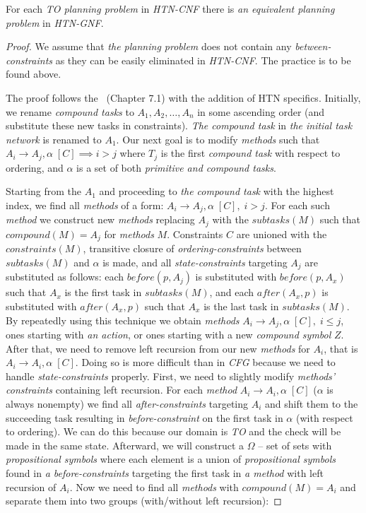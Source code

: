 \begin{thm}\label{thm04:13}
    For each \emph{TO planning problem} in \emph{HTN-CNF} there is \emph{an equivalent planning problem} in \emph{HTN-GNF}.
\end{thm}
\begin{proof}
    We assume that \emph{the planning problem} does not contain any \emph{between-constraints} as they can be easily eliminated in \emph{HTN-CNF}. The practice is to be found above.

    The proof follows the~\cite{gnf} (Chapter 7.1) with the addition of HTN specifics. Initially, we rename \emph{compound tasks} to $A_1, A_2, \dots, A_n$ in some ascending order (and substitute these new tasks in constraints). \emph{The compound task} in \emph{the initial task network} is renamed to $A_1$. Our next goal is to modify \emph{methods} such that $A_i \rightarrow A_j, \alpha \; [C] \implies i > j$ where $T_j$ is the first \emph{compound task} with respect to ordering, and $\alpha$ is a set of both \emph{primitive and compound tasks}.

    Starting from the $A_1$ and proceeding to \emph{the compound task} with the highest index, we find all \emph{methods} of a form:  $A_i \rightarrow A_j, \alpha \; [C], \; i > j$. For each such \emph{method} we construct new \emph{methods} replacing $A_j$ with the $subtasks(M)$ such that $compound(M) = A_j$ for \emph{methods} $M$. Constraints $C$ are unioned with the $constraints(M)$, transitive closure of \emph{ordering-constraints} between $subtasks(M)$ and $\alpha$ is made, and all \emph{state-constraints} targeting $A_j$ are substituted as follows: each $before(p, A_j)$ is substituted with $before(p, A_x)$ such that $A_x$ is the first task in $subtasks(M)$, and each $after(A_x, p)$ is substituted with $after(A_x, p)$ such that $A_x$ is the last task in $subtasks(M)$. By repeatedly using this technique we obtain \emph{methods} $A_i \rightarrow A_j, \alpha \; [C], \; i \leq j$, ones starting with \emph{an action}, or ones starting with a new \emph{compound symbol} $Z$. After that, we need to remove left recursion from our new \emph{methods} for $A_i$, that is $A_i \rightarrow A_i, \alpha \; [C]$. Doing so is more difficult than in \emph{CFG} because we need to handle \emph{state-constraints} properly. First, we need to slightly modify \emph{methods' constraints} containing left recursion. For each \emph{method} $A_i \rightarrow A_i, \alpha \; [C]$ ($\alpha$ is always nonempty) we find all \emph{after-constraints} targeting $A_i$ and shift them to the succeeding task resulting in \emph{before-constraint} on the first task in $\alpha$ (with respect to ordering). We can do this because our domain is \emph{TO} and the check will be made in the same state. Afterward, we will construct a $\Omega$ – set of sets with \emph{propositional symbols} where each element is a union of \emph{propositional symbols} found in \emph{a before-constraints} targeting the first task in \emph{a method} with left recursion of $A_i$. Now we need to find all \emph{methods} with $compound(M) = A_i$ and separate them into two groups (with/without left recursion):


\end{proof}
